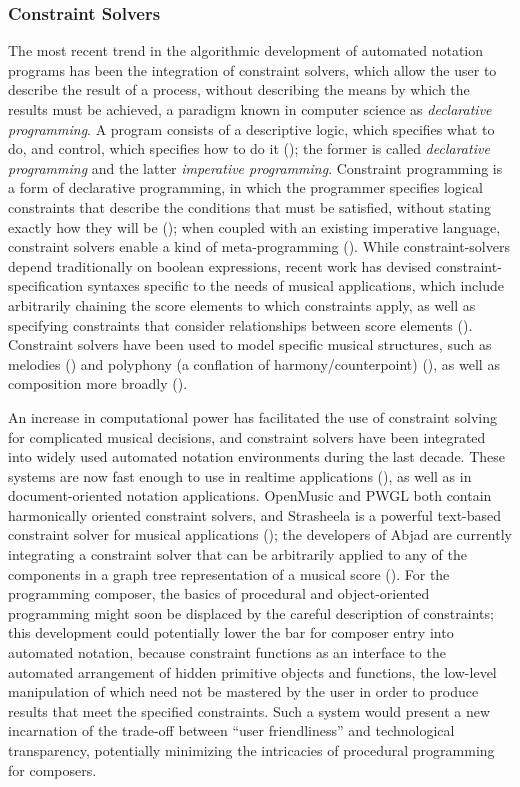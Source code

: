 \subsubsection{Constraint Solvers}

The most recent trend in the algorithmic development of automated notation programs has been the integration of constraint solvers, which allow the user to describe the result of a process, without describing the means by which the results must be achieved, a paradigm known in computer science as \emph{declarative programming}. A program consists of a descriptive logic, which specifies what to do, and control, which specifies how to do it (\cite{kowalski1979algorithm}); the former is called \emph{declarative programming} and the latter \emph{imperative programming}. Constraint programming is a form of declarative programming, in which the programmer specifies logical constraints that describe the conditions that must be satisfied, without stating exactly how they will be (\cite[749]{Van-Roy:2004uq}); when coupled with an existing imperative language, constraint solvers enable a kind of meta-programming (\cite{lloyd1994practical}). While constraint-solvers depend traditionally on boolean expressions, recent work has devised constraint-specification syntaxes specific to the needs of musical applications, which include arbitrarily chaining the score elements to which constraints apply, as well as specifying constraints that consider relationships between score elements (\cite{anders2008higher}). Constraint solvers have been used to model specific musical structures, such as melodies (\cite{Zhong2005}) and polyphony (a conflation of harmony/counterpoint) (\cite{Courtot:1990gb}), as well as composition more broadly (\cite{Desainte-Katherine:1991mb}). 

An increase in computational power has facilitated the use of constraint solving for complicated musical decisions, and constraint solvers have been integrated into widely used automated notation environments during the last decade. These systems are now fast enough to use in realtime applications (\cite{Anders:2008cq}), as well as in document-oriented notation applications. OpenMusic and PWGL both contain harmonically oriented constraint solvers, and Strasheela is a powerful text-based constraint solver for musical applications (\cite{sandred2010pwmc}); the developers of Abjad are currently integrating a constraint solver that can be arbitrarily applied to any of the components in a graph tree representation of a musical score (\cite{Baca:2013kh}). For the programming composer, the basics of procedural and object-oriented programming might soon be displaced by the careful description of constraints; this development could potentially lower the bar for composer entry into automated notation, because constraint functions as an interface to the automated arrangement of hidden primitive objects and functions, the low-level manipulation of which need not be mastered by the user in order to produce results that meet the specified constraints. Such a system would present a new incarnation of the trade-off between ``user friendliness'' and technological transparency, potentially minimizing the intricacies of procedural programming for composers.

